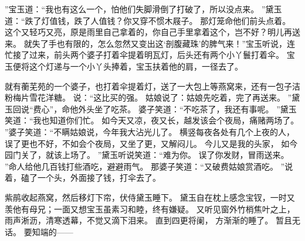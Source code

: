 ”宝玉道：“我也有这么一个，怕他们失脚滑倒了打破了，所以没点来。
”黛玉道：“跌了灯值钱，跌了人值钱？你又穿不惯木屐子。
那灯笼命他们前头点着。
这个又轻巧又亮，原是雨里自己拿着的，你自己手里拿着这个，岂不好？明儿再送来。
就失了手也有限的，怎么忽然又变出这‘剖腹藏珠’的脾气来！”宝玉听说，连忙接了过来，前头两个婆子打着伞提着明瓦灯，后头还有两个小丫鬟打着伞。
宝玉便将这个灯递与一个小丫头捧着，宝玉扶着他的肩，一径去了。
\par
就有蘅芜苑的一个婆子，也打着伞提着灯，送了一大包上等燕窝来，还有一包子洁粉梅片雪花洋糖。
说：“这比买的强。
姑娘说了：姑娘先吃着，完了再送来。
”黛玉回说“费心”，命他外头坐了吃茶。
婆子笑道：“不吃茶了，我还有事呢。
”黛玉笑道：“我也知道你们忙。
如今天又凉，夜又长，越发该会个夜局，痛赌两场了。
”婆子笑道：“不瞒姑娘说，今年我大沾光儿了。
横竖每夜各处有几个上夜的人，误了更也不好，不如会个夜局，又坐了更，又解闷儿。
今儿又是我的头家，
如今园门关了，就该上场了。
”黛玉听说笑道：“难为你。
误了你发财，冒雨送来。
”命人给他几百钱打些酒吃，避避雨气。
那婆子笑道：“又破费姑娘赏酒吃。
”说着，磕了一个头，外面接了钱，打伞去了。
\par
紫鹃收起燕窝，然后移灯下帘，伏侍黛玉睡下。
黛玉自在枕上感念宝钗，一时又羡他有母兄；一面又想宝玉虽素习和睦，终有嫌疑。
又听见窗外竹梢焦叶之上，雨声淅沥，清寒透幕，不觉又滴下泪来。
直到四更将阑，
方渐渐的睡了。
暂且无话。
要知端的——\par
{}
